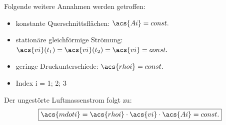 Folgende weitere Annahmen werden getroffen:
\begin{itemize}
    \item konstante Querschnittsflächen: $\acs{Ai} = const.$
    \item stationäre gleichförmige Strömung: $\acs{vi}(t_{\mathrm{1}}) = \acs{vi}(t_{\mathrm{2}}) = \acs{vi} = const.$
    \item geringe Druckunterschiede: $\acs{rhoi} = const.$
    \item Index i = 1; 2; 3
\end{itemize}
\bigskip
Der ungestörte Luftmassenstrom folgt zu: 
\begin{equation} \label{eq:Gleichung2.1}
    \boxed{\acs{mdoti} = \acs{rhoi} \cdot \acs{vi} \cdot \acs{Ai} = const.}
\end{equation}

